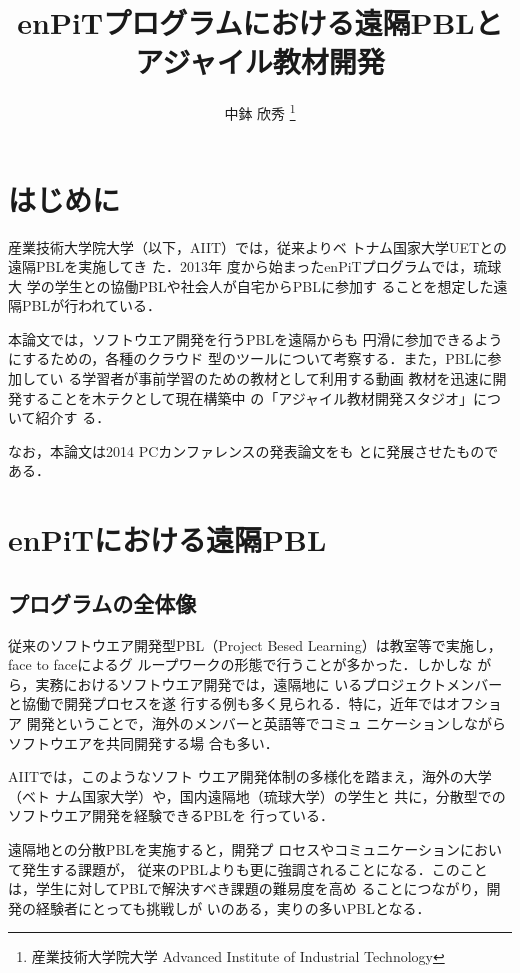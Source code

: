 \documentclass[a4j, 12Q, twocolumn, twoside]{jsarticle}
\title{enPiTプログラムにおける遠隔PBLとアジャイル教材開発}
\author{
  中鉢 欣秀
  \thanks{産業技術大学院大学 \newline
  Advanced Institute of Industrial Technology}
}
\begin{document}
\amaketitle[-1pt]

\section{はじめに}

産業技術大学院大学（以下，AIIT）では，従来よりベ
トナム国家大学UETとの遠隔PBLを実施してき
た\cite{酒瀬川泰孝:2013, 木崎悟2012国際, 木崎:2011:チ
  ケット駆動, 木崎悟:2011-05-10, Nishino:2010,
  pub:tozawa-global-2009, 大類優子:2009}．2013年
度から始まったenPiTプログラム\cite{wired:2014,
  enPiT_aiit:2013, enPiT:2012:about}では，琉球大
学の学生との協働PBLや社会人が自宅からPBLに参加す
ることを想定した遠隔PBLが行われている．

本論文では，ソフトウエア開発を行うPBLを遠隔からも
円滑に参加できるようにするための，各種のクラウド
型のツールについて考察する．また，PBLに参加してい
る学習者が事前学習のための教材として利用する動画
教材を迅速に開発することを木テクとして現在構築中
の「アジャイル教材開発スタジオ」について紹介す
る．

なお，本論文は2014 PCカンファレンスの発表論文をも
とに発展させたものである．

\section{enPiTにおける遠隔PBL}
\subsection{プログラムの全体像}
従来のソフトウエア開発型PBL（Project Besed
Learning）は教室等で実施し，face to faceによるグ
ループワークの形態で行うことが多かった．しかしな
がら，実務におけるソフトウエア開発では，遠隔地に
いるプロジェクトメンバーと協働で開発プロセスを遂
行する例も多く見られる．特に，近年ではオフショア
開発ということで，海外のメンバーと英語等でコミュ
ニケーションしながらソフトウエアを共同開発する場
合も多い．

AIITでは，このようなソフト
ウエア開発体制の多様化を踏まえ，海外の大学（ベト
ナム国家大学）や，国内遠隔地（琉球大学）の学生と
共に，分散型でのソフトウエア開発を経験できるPBLを
行っている．

遠隔地との分散PBLを実施すると，開発プ
ロセスやコミュニケーションにおいて発生する課題が，
従来のPBLよりも更に強調されることになる．このこと
は，学生に対してPBLで解決すべき課題の難易度を高め
ることにつながり，開発の経験者にとっても挑戦しが
いのある，実りの多いPBLとなる．
\end{document}
